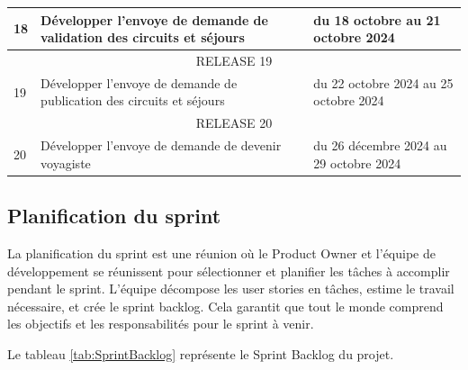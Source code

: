 \documentclass[12pt]{report}
\begin{document}
\begin{longtable}{|p{1cm}|p{7cm}|p{6cm}|}
						\hline
						18 & Développer l'envoye de demande de validation des circuits et séjours & du 18 octobre au 21 octobre 2024\\
						\hline
						\multicolumn{3}{|c|}{RELEASE 19}\\
						\hline
						19 & Développer l'envoye de demande de publication des circuits et séjours & du 22 octobre 2024 au 25 octobre 2024\\
						\hline
						\multicolumn{3}{|c|}{RELEASE 20}\\
						\hline
	 					20 & Développer l'envoye de demande de devenir voyagiste & du 26 décembre 2024 au 29 octobre 2024\\
						\hline
						 							
			
				    \end{longtable}

				\subsection{Planification du sprint}

				\hspace{15pt} La planification du sprint est une réunion où le Product Owner et l'équipe de développement se réunissent pour sélectionner et planifier les tâches à accomplir pendant le sprint. L'équipe décompose les user stories en tâches, estime le travail nécessaire, et crée le sprint backlog. Cela garantit que tout le monde comprend les objectifs et les responsabilités pour le sprint à venir.

				Le tableau \ref{tab:SprintBacklog} représente le Sprint Backlog du projet.
\end{document}
